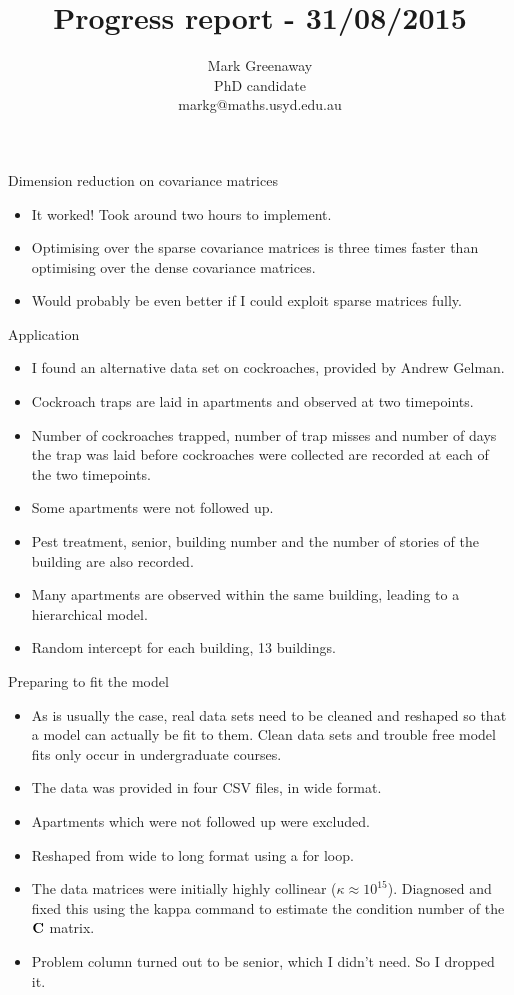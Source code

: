 \documentclass{beamer}
\title{Progress report - 31/08/2015}
\author{Mark Greenaway\\PhD candidate\\markg@maths.usyd.edu.au}
\begin{document}
\begin{frame}
\maketitle
\end{frame}

\begin{frame}{Dimension reduction on covariance matrices}
\begin{itemize}
\item It worked! Took around two hours to implement.
\item Optimising over the sparse covariance matrices is three times faster than optimising
		over the dense covariance matrices.
\item Would probably be even better if I could exploit sparse matrices fully.
\end{itemize}
\end{frame}

\begin{frame}{Application}
\begin{itemize}
\item I found an alternative data set on cockroaches, provided by Andrew Gelman.
\item Cockroach traps are laid in apartments and observed at two timepoints.
\item Number of cockroaches trapped, number of trap misses and number of days the trap was laid
	  before cockroaches were collected are recorded at each of the two timepoints.
\item Some apartments were not followed up.
\item Pest treatment, senior, building number and the number of stories of the building are also
      recorded.
\item Many apartments are observed within the same building, leading to a hierarchical model.
\item Random intercept for each building, 13 buildings.
\end{itemize}
\end{frame}

\begin{frame}{Preparing to fit the model}
\begin{itemize}
\item As is usually the case, real data sets need to be cleaned and reshaped so that a model can
actually be fit to them. Clean data sets and trouble free model fits only occur in undergraduate
courses.
\item The data was provided in four CSV files, in wide format.
\item Apartments which were not followed up were excluded.
\item Reshaped from wide to long format using a for loop.
\item The data matrices were initially highly collinear ($\kappa \approx 10^{15}$). Diagnosed and fixed this
using the kappa command to estimate the condition number of the ${\bf C}$ matrix.
\item Problem column turned out to be senior, which I didn't need. So I dropped it.
\end{itemize}
\end{frame}
\end{document}
